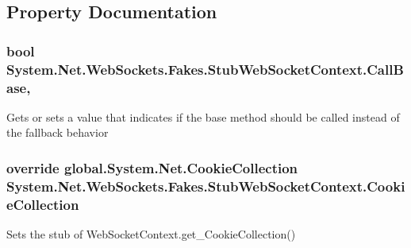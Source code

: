 \subsection{Property Documentation}
\hypertarget{class_system_1_1_net_1_1_web_sockets_1_1_fakes_1_1_stub_web_socket_context_a8cc4c6ac3a454bff1c8b619da59182d7}{
\subsubsection[{Call\-Base}]{\setlength{\rightskip}{0pt plus 5cm}bool System.\-Net.\-Web\-Sockets.\-Fakes.\-Stub\-Web\-Socket\-Context.\-Call\-Base\hspace{0.3cm}{\ttfamily [get]}, {\ttfamily [set]}}}\label{class_system_1_1_net_1_1_web_sockets_1_1_fakes_1_1_stub_web_socket_context_a8cc4c6ac3a454bff1c8b619da59182d7}


Gets or sets a value that indicates if the base method should be called instead of the fallback behavior

\hypertarget{class_system_1_1_net_1_1_web_sockets_1_1_fakes_1_1_stub_web_socket_context_a00a9dd5f148ba19661b4302a67c985d4}{
\subsubsection[{Cookie\-Collection}]{\setlength{\rightskip}{0pt plus 5cm}override global.\-System.\-Net.\-Cookie\-Collection System.\-Net.\-Web\-Sockets.\-Fakes.\-Stub\-Web\-Socket\-Context.\-Cookie\-Collection\hspace{0.3cm}{\ttfamily [get]}}}\label{class_system_1_1_net_1_1_web_sockets_1_1_fakes_1_1_stub_web_socket_context_a00a9dd5f148ba19661b4302a67c985d4}


Sets the stub of Web\-Socket\-Context.\-get\-\_\-\-Cookie\-Collection()

